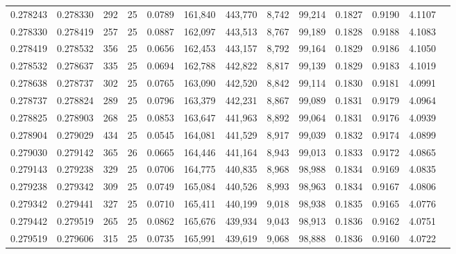 \begin{tabular}{rrrrrrrrrrrrr}
0.278243 & 0.278330 &   292 &  25 &                                     0.0789 & 161,840 & 443,770 &   8,742 &  99,214 & 0.1827 & 0.9190 & 4.1107 \\
0.278330 & 0.278419 &   257 &  25 &                                     0.0887 & 162,097 & 443,513 &   8,767 &  99,189 & 0.1828 & 0.9188 & 4.1083 \\
0.278419 & 0.278532 &   356 &  25 &                                     0.0656 & 162,453 & 443,157 &   8,792 &  99,164 & 0.1829 & 0.9186 & 4.1050 \\
0.278532 & 0.278637 &   335 &  25 &                                     0.0694 & 162,788 & 442,822 &   8,817 &  99,139 & 0.1829 & 0.9183 & 4.1019 \\
0.278638 & 0.278737 &   302 &  25 &                                     0.0765 & 163,090 & 442,520 &   8,842 &  99,114 & 0.1830 & 0.9181 & 4.0991 \\
0.278737 & 0.278824 &   289 &  25 &                                     0.0796 & 163,379 & 442,231 &   8,867 &  99,089 & 0.1831 & 0.9179 & 4.0964 \\
0.278825 & 0.278903 &   268 &  25 &                                     0.0853 & 163,647 & 441,963 &   8,892 &  99,064 & 0.1831 & 0.9176 & 4.0939 \\
0.278904 & 0.279029 &   434 &  25 &                                     0.0545 & 164,081 & 441,529 &   8,917 &  99,039 & 0.1832 & 0.9174 & 4.0899 \\
0.279030 & 0.279142 &   365 &  26 &                                     0.0665 & 164,446 & 441,164 &   8,943 &  99,013 & 0.1833 & 0.9172 & 4.0865 \\
0.279143 & 0.279238 &   329 &  25 &                                     0.0706 & 164,775 & 440,835 &   8,968 &  98,988 & 0.1834 & 0.9169 & 4.0835 \\
0.279238 & 0.279342 &   309 &  25 &                                     0.0749 & 165,084 & 440,526 &   8,993 &  98,963 & 0.1834 & 0.9167 & 4.0806 \\
0.279342 & 0.279441 &   327 &  25 &                                     0.0710 & 165,411 & 440,199 &   9,018 &  98,938 & 0.1835 & 0.9165 & 4.0776 \\
0.279442 & 0.279519 &   265 &  25 &                                     0.0862 & 165,676 & 439,934 &   9,043 &  98,913 & 0.1836 & 0.9162 & 4.0751 \\
0.279519 & 0.279606 &   315 &  25 &                                     0.0735 & 165,991 & 439,619 &   9,068 &  98,888 & 0.1836 & 0.9160 & 4.0722 \\

\end{tabular}
